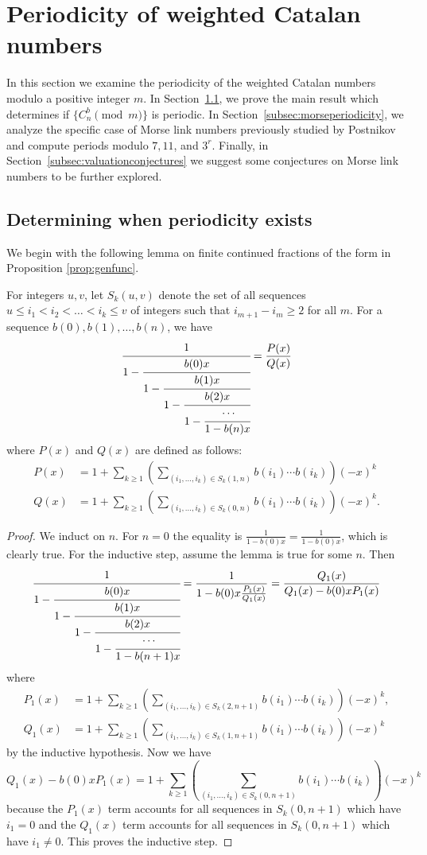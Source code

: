 \section{Periodicity of weighted Catalan numbers}\label{sec:period}
In this section we examine the periodicity of the weighted Catalan numbers modulo a positive integer $m$. In Section~\ref{subsec:period}, we prove the main result which determines if $\{C^b_n\pmod{m}\}$ is periodic. In Section~\ref{subsec:morseperiodicity}, we analyze the specific case of Morse link numbers previously studied by Postnikov and compute periods modulo $7, 11$, and $3^r$. Finally, in Section~\ref{subsec:valuationconjectures} we suggest some conjectures on Morse link numbers to be further explored.

\subsection{Determining when periodicity exists}\label{subsec:period}

We begin with the following lemma on finite continued fractions of the form in Proposition \ref{prop:genfunc}.

\begin{lemma}
\label{lem:cfracexpansion}
For integers $u, v$, let $S_k(u, v)$ denote the set of all sequences $u\leq i_1 < i_2 < \dotsc < i_k\leq v$ of integers such that $i_{m+1}-i_m\geq 2$ for all $m$. For a sequence $b(0), b(1), \dotsc, b(n)$, we have
\[\cfrac{1}{1-\cfrac{b(0)x}{1-\cfrac{b(1)x}{1-\cfrac{b(2)x}{1-\cfrac{\cdots}{1-b(n)x}}}}}=\frac{P(x)}{Q(x)}\]
where $P(x)$ and $Q(x)$ are defined as follows:
\begin{align*}
    P(x) &= 1+\sum_{k\geq 1}\left(\sum_{(i_1, \dotsc, i_k)\in S_k(1, n)}b(i_1)\dotsm b(i_k)\right)(-x)^k \\
    Q(x) &= 1+\sum_{k\geq 1}\left(\sum_{(i_1, \dotsc, i_k)\in S_k(0, n)}b(i_1)\dotsm b(i_k)\right)(-x)^k.
\end{align*}
\end{lemma}
\begin{proof}
    We induct on $n$. For $n=0$ the equality is $\frac{1}{1-b(0)x}=\frac{1}{1-b(0)x}$, which is clearly true. For the inductive step, assume the lemma is true for some $n$. Then
    \[\cfrac{1}{1-\cfrac{b(0)x}{1-\cfrac{b(1)x}{1-\cfrac{b(2)x}{1-\cfrac{\cdots}{1-b(n+1)x}}}}}=\frac{1}{1-b(0)x\frac{P_1(x)}{Q_1(x)}}=\frac{Q_1(x)}{Q_1(x)-b(0)xP_1(x)}\]
    where
    \begin{align*}
    P_1(x) &= 1+\sum_{k\geq 1}\left(\sum_{(i_1, \dotsc, i_k)\in S_k(2, n+1)}b(i_1)\dotsm b(i_k)\right)(-x)^k, \\
    Q_1(x) &= 1+\sum_{k\geq 1}\left(\sum_{(i_1, \dotsc, i_k)\in S_k(1, n+1)}b(i_1)\dotsm b(i_k)\right)(-x)^k
    \end{align*}
    by the inductive hypothesis. Now we have
    \[Q_1(x)-b(0)xP_1(x)=1+\sum_{k\geq 1}\left(\sum_{(i_1, \dotsc, i_k)\in S_k(0, n+1)}b(i_1)\dotsm b(i_k)\right)(-x)^k\]
    because the $P_1(x)$ term accounts for all sequences in $S_k(0, n+1)$ which have $i_1=0$ and the $Q_1(x)$ term accounts for all sequences in $S_k(0, n+1)$ which have $i_1\neq 0$. This proves the inductive step.
\end{proof}

